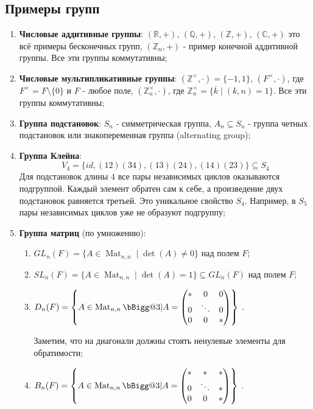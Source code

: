 \documentclass[12pt]{article}
\newcommand{\MR}{\mathbb{R}}
\newcommand{\MC}{\mathbb{C}}
\newcommand{\MQ}{\mathbb{Q}}
\newcommand{\MZ}{\mathbb{Z}}
\theoremstyle{definition}
\newcommand{\ovl}[1]{\overline{#1}}
\newcommand{\mat}[2]{\operatorname{Mat}_{#1, #2}}
\begin{document}
\subsection*{Примеры групп}
\begin{enumerate}[label=\arabic*)]
	\item \textbf{Числовые аддитивные группы}: $(\MR, +), \, (\MQ, +), \, (\MZ, +), \, (\MC, +)$
	это всё примеры бесконечных групп, $(\MZ_n, +)$ - пример конечной аддитивной группы. Все эти группы коммутативны;
	\item \textbf{Числовые мультипликативные группы}: $(\MZ^\times, {\cdot}) = \{-1,1\}$, $(F^\times, \cdot)$, где  $F^\times = F\setminus \{0\}$ и $F$ - любое поле, $(\MZ_n^\times,\cdot)$, где $\MZ_n^\times = \{\ovl{k}\mid (k,n) = 1\}$. Все эти группы коммутативны;
	\item \textbf{Группа подстановок}: $S_n$ - симметрическая группа, $A_n \subseteq S_n$ - группа четных подстановок или знакопеременная группа (alternating group);
	\item \textbf{Группа Клейна}: 
	$$
		V_4 = \{id, (12)(34), (13)(24), (14)(23)\} \subseteq S_4
	$$
	Для подстановок длины $4$ все пары независимых циклов оказываются подгруппой. Каждый элемент обратен сам к себе, а произведение двух подстановок равняется третьей. Это уникальное свойство $S_4$. Например, в $S_5$ пары независимых циклов уже не образуют подгруппу;
	\item \textbf{Группа матриц} (по умножению):
	\begin{enumerate}[label=(\arabic*)]
		\item $GL_n(F) =\{A \in \mat{n}{n} \mid \det(A) \neq 0\}$  над полем $F$;
		\item $SL_n(F) =\{A \in \mat{n}{n} \mid \det(A) = 1\} \subseteq GL_n(F)$  над полем $F$;
		\item $D_n(F) = \left\{A \in \mat{n}{n} \bBigg@{3}| A =
		\begin{pmatrix}
			* & 0  & 0 \\
			0 & \ddots & 0\\
			0 & 0 & *
		\end{pmatrix} \right\}$ .
	
		Заметим, что на диагонали должны стоять ненулевые элементы для обратимости;
		\item $B_n(F) = \left\{A \in \mat{n}{n} \bBigg@{3}| A =
		\begin{pmatrix}
			* & *  & * \\
			0 & \ddots & *\\
			0 & 0 & *
		\end{pmatrix} \right\}$ .
	

\end{enumerate}
\end{enumerate}
\end{document}
